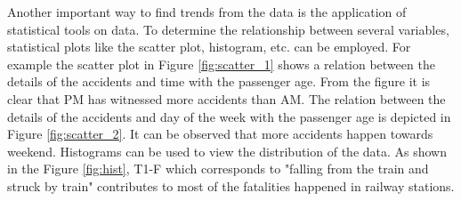 Another important way to find trends from the data is the application of statistical tools on data. To determine the relationship between several variables, statistical plots like the scatter plot, histogram, etc. can be employed. For example the scatter plot in Figure \ref{fig:scatter_1} shows a relation between the details of the accidents and time with the passenger age. From the figure it is clear that PM has witnessed more accidents than AM. The relation between the details of the accidents and day of the week with the passenger age is depicted in Figure \ref{fig:scatter_2}. It can be observed that more accidents happen towards weekend. Histograms can be used to view the distribution of the data. As shown in the Figure \ref{fig:hist}, T1-F which corresponds to "falling from the train and struck by train" contributes to most of the fatalities happened in railway stations.

